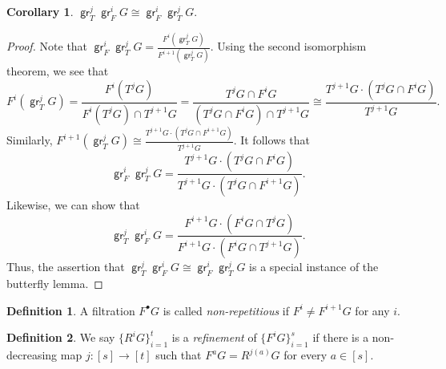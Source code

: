\documentclass[10pt,letterpaper,cm]{nupset}
\theoremstyle{definition}
\newtheorem*{definition}{Definition}
\newtheorem{corollary}{Corollary}
\newcommand{\1}{\mathbf{1}}
\newcommand{\0}{\vec 0}
\DeclareMathOperator{\gr}{\mathsf{gr}}
\begin{document}
\begin{corollary}
$\gr_T^j\gr_F^i{G} \cong \gr_F^i \gr_T^j{G}$.
\end{corollary}
\begin{proof}
Note that $\gr_F^i \gr_T^j{G} = \frac{F^i(\gr_T^j{G})}{F^{i+1}(\gr_T^j{G})}$. 
Using the second isomorphism theorem, we see that $$F^i(\gr_T^j{G}) = \frac{F^i(T^j{G})}{F^i(T^j{G}) \cap T^{j+1}{G}} = \frac{T^j{G} \cap F^i{G}}{(T^j{G} \cap F^i{G}) \cap T^{j+1}{G}} \cong \frac{T^{j+1}{G} \cdot (T^j{G} \cap F^i{G})}{T^{j+1}{G}} .$$ 
Similarly, $F^{i+1}(\gr_T^j{G}) \cong \frac{T^{j+1}{G} \cdot (T^j{G} \cap F^{i+1}{G})}{T^{j+1}{G}}.$ 
It follows that $$\gr_F^i \gr_T^j{G} = \frac{T^{j+1}{G} \cdot (T^j{G} \cap F^{i}{G})}{T^{j+1}{G} \cdot (T^j{G} \cap F^{i+1}{G})}.$$
Likewise, we can show that
$$\gr_T^j \gr_F^i{G} = \frac{F^{i+1}{G} \cdot (F^i{G} \cap T^{j}{G})}{F^{i+1}{G} \cdot (F^i{G} \cap T^{j+1}{G})}.$$ Thus, the assertion that $\gr_T^j\gr_F^i{G} \cong \gr_F^i \gr_T^j{G}$ is a special instance of the butterfly lemma. 
\end{proof}

\begin{definition}
A filtration $F^{\bullet}G$ is called \textit{non-repetitious} if $F^i \ne F^{i+1}G$ for any $i$. 
\end{definition}

\begin{definition}
We say $\{R^iG\}_{i=1}^t$ is a \textit{refinement} of $\{F^iG\}_{i=1}^s$ if there is a non-decreasing map $j : [s] \to [t]$ such that $F^aG = R^{j(a)}G $ for every $a \in [s]$.
\end{definition}
\end{document}
